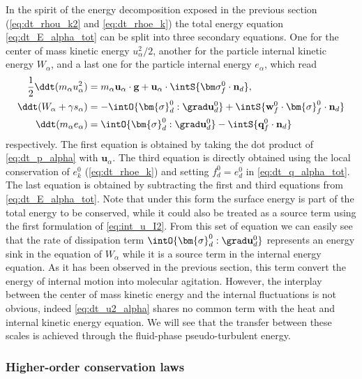 In the spirit of the energy decomposition exposed in the previous section (\ref{eq:dt_rhou_k2} and \ref{eq:dt_rhoe_k}) the total energy equation \ref{eq:dt_E_alpha_tot} can be split into three secondary equations. 
One for the center of mass kinetic energy $u_\alpha^2/2$, another for the particle internal kinetic energy $W_\alpha$, and a last one for the particle internal energy $e_\alpha$, which read
\begin{align}
    \label{eq:dt_u2_alpha}
    \frac{1}{2}\ddt (m_\alpha u_\alpha^2)
    &= 
    m_\alpha\textbf{u}_\alpha\cdot
    \textbf{g}
    + 
    \textbf{u}_\alpha\cdot
    \intS{\bm\sigma_f^0 \cdot \textbf{n}_d},\\
    \label{eq:dt_w2_alpha}
    \ddt (W_\alpha + \gamma s_\alpha)
    &= 
    - \intO{ \bm{\sigma}_d^0 : \grad\textbf{u}_d^0 }
    + \intS {\textbf{w}_f^0 \cdot \bm{\sigma}_f^0 \cdot \textbf{n}_d }
    \\
     \label{eq:dt_e_alpha}
    \ddt (m_\alpha e_\alpha )
    &= 
     \intO{ \bm{\sigma}_d^0 : \grad\textbf{u}_d^0  }
    -  \intS{\textbf{q}_f^0\cdot \textbf{n}_d } 
\end{align}
respectively. 
The first equation is obtained by taking the dot product of \ref{eq:dt_p_alpha} with $\textbf{u}_\alpha$. 
The third equation is directly obtained using the local conservation of $e_k^0$ (\ref{eq:dt_rhoe_k}) and setting $f_d^0 = e_d^0$ in \ref{eq:dt_q_alpha_tot}.
The last equation is obtained by subtracting the first and third equations from \ref{eq:dt_E_alpha_tot}. 
Note that under this form the surface energy is part of the total energy to be conserved, while it could also be treated as a source term using the first formulation of \ref{eq:int_u_I2}.
From this set of equation we can easily see that the rate of dissipation term $\intO{\bm{\sigma}_d^0 : \grad\textbf{u}_d^0}$ represents an energy sink in the equation of $W_\alpha$ while it is a source term in the internal energy equation. 
As it has been observed in the previous section, this term convert the energy of internal motion into molecular agitation. 
However, the interplay between the center of mass kinetic energy and the internal fluctuations is not obvious, indeed \ref{eq:dt_u2_alpha} shares no common term with the heat and internal kinetic energy equation.
We will see that the transfer between these scales is achieved through the fluid-phase pseudo-turbulent energy. 



\subsubsection{Higher-order conservation laws}


